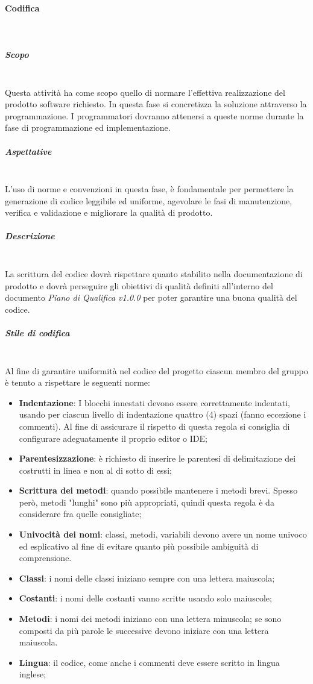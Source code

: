 		\paragraph{Codifica} \mbox{}\\
			\subparagraph{Scopo} \mbox{}\\
			Questa attività ha come scopo quello di normare l'effettiva realizzazione del prodotto software richiesto. In questa fase si concretizza la soluzione attraverso la programmazione. I programmatori dovranno attenersi a queste norme durante la fase di programmazione ed implementazione.
			\subparagraph{Aspettative} \mbox{}\\
			L'uso di norme e convenzioni in questa fase, è fondamentale per permettere la generazione di codice leggibile ed uniforme,  agevolare le fasi di manutenzione,  verifica e validazione e migliorare la qualità di prodotto.
			\subparagraph{Descrizione} \mbox{}\\
			La scrittura del codice dovrà rispettare quanto stabilito nella documentazione di prodotto e dovrà perseguire gli obiettivi di qualità definiti all’interno del documento \textit{Piano di Qualifica v1.0.0} per poter garantire una buona qualità del codice.
			\subparagraph{Stile di codifica} \mbox{}\\
			Al fine di garantire uniformità nel codice del progetto ciascun membro del gruppo è
			tenuto a rispettare le seguenti norme:
			\begin{itemize}
				\item \textbf{Indentazione}: I blocchi innestati devono essere correttamente indentati, usando per ciascun livello di indentazione quattro (4) spazi (fanno eccezione i commenti). Al fine di assicurare il rispetto di questa regola si consiglia di configurare adeguatamente il proprio editor o IDE;
				\item \textbf{Parentesizzazione}: è richiesto di inserire le parentesi di delimitazione dei costrutti in linea e non al di sotto di essi;
				\item \textbf{Scrittura dei metodi}: quando possibile mantenere i metodi brevi. Spesso però, metodi "lunghi" sono più appropriati, quindi questa regola è da considerare fra quelle consigliate;
				\item \textbf{Univocità dei nomi}: classi, metodi, variabili devono avere un nome univoco	ed esplicativo al fine di evitare quanto più possibile ambiguità di comprensione.
				\item \textbf{Classi}: i nomi delle classi iniziano sempre con una lettera maiuscola;
				\item \textbf{Costanti}: i nomi delle costanti vanno scritte usando solo maiuscole;
				\item \textbf{Metodi}: i nomi dei metodi iniziano con una lettera minuscola;
				se sono composti da più parole le successive devono iniziare con una lettera
				maiuscola.
				\item \textbf{Lingua}: il codice, come anche i commenti deve essere scritto in lingua inglese;
			\end{itemize}
